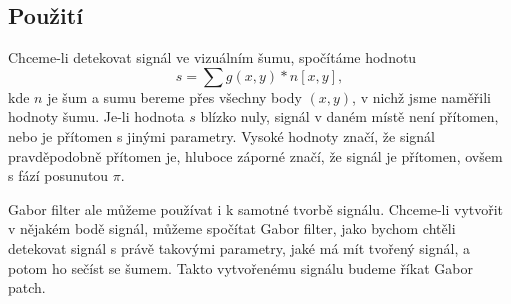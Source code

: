 \subsection{Použití}

Chceme-li detekovat signál ve vizuálním šumu, spočítáme hodnotu $$s=\sum g(x,y)*n[x,y],$$ kde $n$ je šum a sumu bereme přes všechny body $(x,y)$, v nichž jsme naměřili hodnoty šumu. Je-li hodnota $s$  blízko nuly, signál v daném místě
není přítomen, nebo je přítomen s jinými parametry. Vysoké hodnoty značí, že
signál pravděpodobně přítomen je, hluboce záporné značí, že signál je přítomen,
ovšem s fází posunutou $\pi$.

Gabor filter ale můžeme používat i k samotné tvorbě signálu. Chceme-li vytvořit
v nějakém bodě signál, můžeme spočítat Gabor filter, jako bychom chtěli
detekovat signál s právě takovými parametry, jaké má mít tvořený signál, a potom ho sečíst se šumem. Takto vytvořenému signálu budeme říkat
Gabor patch.

